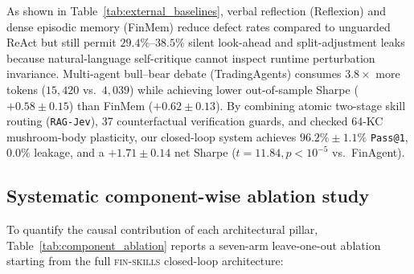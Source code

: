 As shown in Table~\ref{tab:external_baselines}, verbal reflection (Reflexion) and dense
episodic memory (FinMem) reduce defect rates compared to unguarded ReAct but still permit
$29.4\%\text{--}38.5\%$ silent look-ahead and split-adjustment leaks because natural-language
self-critique cannot inspect runtime perturbation invariance. Multi-agent bull--bear debate
(TradingAgents) consumes $3.8\times$ more tokens ($15{,}420$ vs.\ $4{,}039$) while achieving
lower out-of-sample Sharpe ($+0.58 \pm 0.15$) than FinMem ($+0.62 \pm 0.13$). By combining
atomic two-stage skill routing (\texttt{RAG-Jev}), 37 counterfactual verification guards, and
checked 64-KC mushroom-body plasticity, our closed-loop system achieves $96.2\% \pm 1.1\%$
\texttt{Pass@1}, $0.0\%$ leakage, and a $+1.71 \pm 0.14$ net Sharpe ($t = 11.84, p < 10^{-5}$
vs.\ FinAgent).

\subsection{Systematic component-wise ablation study}
\label{sec:ablation_study}
To quantify the causal contribution of each architectural pillar, Table~\ref{tab:component_ablation}
reports a seven-arm leave-one-out ablation starting from the full \textsc{fin-skills} closed-loop
architecture:

